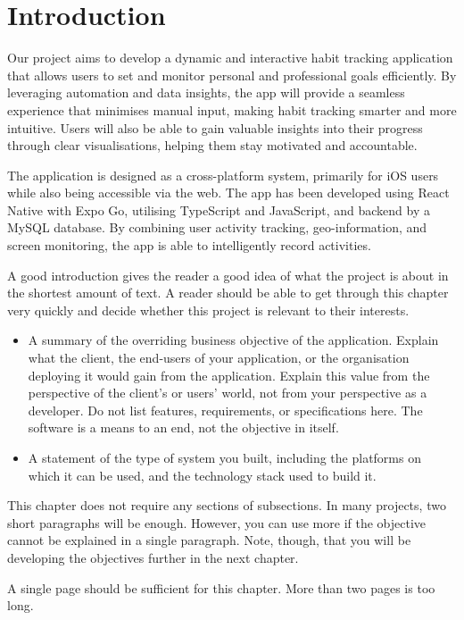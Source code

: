 \chapter{Introduction}
\label{chap:introduction}
Our project aims to develop a dynamic and interactive habit tracking application that allows users to set and monitor personal and professional goals efficiently. By leveraging automation and data insights, the app will provide a seamless experience that minimises manual input, making habit tracking smarter and more intuitive. Users will also be able to gain valuable insights into their progress through clear visualisations, helping them stay motivated and accountable.

The application is designed as a cross-platform system, primarily for iOS users while also being accessible via the web. The app has been developed using React Native with Expo Go, utilising TypeScript and JavaScript, and backend by a MySQL database. By combining user activity tracking, geo-information, and screen monitoring, the app is able to intelligently record activities.


\begin{expectations}
A good introduction gives the reader a good idea of what the project is about in the shortest amount of text.  A reader should be able to get through this chapter very quickly and decide whether this project is relevant to their interests.
\begin{itemize}
\item A summary of the overriding business objective of the application.  Explain what the client, the end-users of your application, or the organisation deploying it would gain from the application.  Explain this value from the perspective of the client's or users' world, not from your perspective as a developer.   Do not list features, requirements, or specifications here.  The software is a means to an end, not the objective in itself.
\item A statement of the type of system you built, including the platforms on which it can be used, and the technology stack used to build it.
\end{itemize}
This chapter does not require any sections of subsections.  In many projects, two short paragraphs will be enough.  However, you can use more if the objective cannot be explained in a single paragraph.  Note, though, that you will be developing the objectives further in the next chapter.
\end{expectations}

\begin{length}
A single page should be sufficient for this chapter.  More than two pages is too long.
\end{length}
